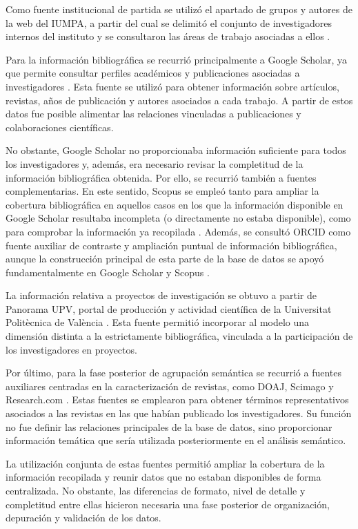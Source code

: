 \documentclass[11pt,spanish,listoffigures,listoftables]{tfgetsinf}
\begin{document}
Como fuente institucional de partida se utilizó el apartado de grupos y autores de la web del IUMPA, a partir del cual se delimitó el conjunto de investigadores internos del instituto y se consultaron las áreas de trabajo asociadas a ellos \cite{web_iumpa}.

Para la información bibliográfica se recurrió principalmente a Google Scholar, ya que permite consultar perfiles académicos y publicaciones asociadas a investigadores \cite{google_scholar}. Esta fuente se utilizó para obtener información sobre artículos, revistas, años de publicación y autores asociados a cada trabajo. A partir de estos datos fue posible alimentar las relaciones vinculadas a publicaciones y colaboraciones científicas.

No obstante, Google Scholar no proporcionaba información suficiente para todos los investigadores y, además, era necesario revisar la completitud de la información bibliográfica obtenida. Por ello, se recurrió también a fuentes complementarias. En este sentido, Scopus se empleó tanto para ampliar la cobertura bibliográfica en aquellos casos en los que la información disponible en Google Scholar resultaba incompleta (o directamente no estaba disponible), como para comprobar la información ya recopilada \cite{scopus}. Además, se consultó ORCID como fuente auxiliar de contraste y ampliación puntual de información bibliográfica, aunque la construcción principal de esta parte de la base de datos se apoyó fundamentalmente en Google Scholar y Scopus \cite{orcid}.

La información relativa a proyectos de investigación se obtuvo a partir de Panorama UPV, portal de producción y actividad científica de la Universitat Politècnica de València \cite{panorama_upv}. Esta fuente permitió incorporar al modelo una dimensión distinta a la estrictamente bibliográfica, vinculada a la participación de los investigadores en proyectos.

Por último, para la fase posterior de agrupación semántica se recurrió a fuentes auxiliares centradas en la caracterización de revistas, como DOAJ, Scimago y Research.com \cite{doaj,scimago,research_com}. Estas fuentes se emplearon para obtener términos representativos asociados a las revistas en las que habían publicado los investigadores. Su función no fue definir las relaciones principales de la base de datos, sino proporcionar información temática que sería utilizada posteriormente en el análisis semántico.

La utilización conjunta de estas fuentes permitió ampliar la cobertura de la información recopilada y reunir datos que no estaban disponibles de forma centralizada. No obstante, las diferencias de formato, nivel de detalle y completitud entre ellas hicieron necesaria una fase posterior de organización, depuración y validación de los datos.
\end{document}
